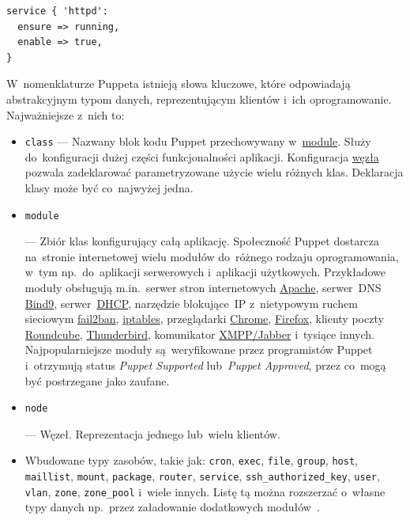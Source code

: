 \documentclass[thesis]{subfiles}
\begin{document}
\begin{lstlisting}[numbers=none,caption={Manifest Puppet gwarantujący, że~\gls{demon} \hreftt{https://httpd.apache.org/}{httpd} jest włączony i~działa},label=lst:puppet-httpd-example]
service { 'httpd':
  ensure => running,
  enable => true,
}
\end{lstlisting}

W~nomenklaturze Puppeta istnieją słowa kluczowe, które odpowiadają abstrakcyjnym typom danych, reprezentującym klientów i~ich oprogramowanie. Najważniejsze z~nich to:\mynobreakpar
\begin{itemize}
\item \texttt{class} --- Nazwany blok kodu Puppet przechowywany w~\hyperlink{itm:puppetmodule}{module}. Służy do~konfiguracji dużej części funkcjonalności aplikacji. Konfiguracja \hyperlink{itm:puppetnode}{węzła} pozwala zadeklarować parametryzowane użycie wielu różnych klas. Deklaracja klasy może być co~najwyżej jedna.
\item \hypertarget{itm:puppetmodule}{\texttt{module}} --- Zbiór klas konfigurujący całą aplikację. Społeczność Puppet dostarcza na~stronie internetowej  wielu modułów do~różnego rodzaju oprogramowania, w~tym np.~do~aplikacji serwerowych i~aplikacji użytkowych. Przykładowe moduły obsługują m.in.~serwer stron internetowych \href{https://forge.puppet.com/puppetlabs/apache}{Apache}, serwer~DNS \href{https://forge.puppet.com/ajjahn/dns}{Bind9}, serwer~\href{https://forge.puppet.com/theforeman/dhcp}{DHCP}, narzędzie blokujące~IP z~nietypowym ruchem sieciowym \href{https://forge.puppet.com/netmanagers/fail2ban}{fail2ban}, \href{https://forge.puppet.com/example42/iptables}{iptables}, przeglądarki \href{https://forge.puppet.com/jamesnetherton/google_chrome}{Chrome}, \href{https://forge.puppet.com/h4x/firefox}{Firefox}, klienty poczty \href{https://forge.puppet.com/hetzner/roundcube}{Roundcube}, \href{https://forge.puppet.com/jgoettsch/thunderbird}{Thunderbird}, komunikator \href{https://forge.puppet.com/jamtur01/xmpp}{XMPP/Jabber} i~tysiące innych. Najpopularniejsze moduły są~weryfikowane przez programistów Puppet i~otrzymują status \emph{Puppet Supported} lub~\emph{Puppet Approved}, przez co~mogą być postrzegane jako zaufane.
\item \hypertarget{itm:puppetnode}{\texttt{node}} --- Węzeł. Reprezentacja jednego lub~wielu klientów.
\item Wbudowane typy zasobów, takie jak: \texttt{cron}, \texttt{exec}, \texttt{file}, \texttt{group}, \texttt{host}, \texttt{maillist}, \texttt{mount}, \texttt{package}, \texttt{router}, \texttt{service}, \texttt{ssh\_authorized\_key}, \texttt{user}, \texttt{vlan}, \texttt{zone}, \texttt{zone\_pool} i~wiele innych. Listę tą można rozszerzać o~własne typy danych np.~przez załadowanie dodatkowych modułów~\cite{puppet-resources-types}.
\end{itemize}
\end{document}
